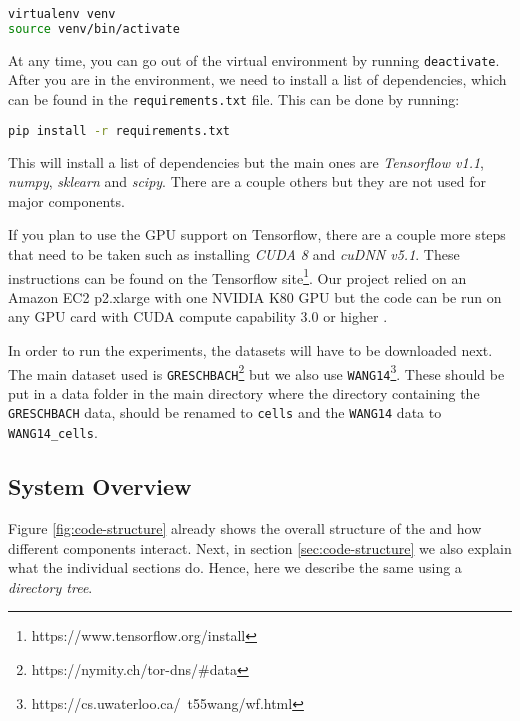 \begin{lstlisting}[language=Bash]
virtualenv venv
source venv/bin/activate
\end{lstlisting}

At any time, you can go out of the virtual environment by running \texttt{deactivate}.
After you are in the environment, we need to install a list of dependencies, which can be found in the \texttt{requirements.txt} file.
This can be done by running:
\begin{lstlisting}[language=Bash]
pip install -r requirements.txt
\end{lstlisting}

This will install a list of dependencies but the main ones are \textit{Tensorflow v1.1}, \textit{numpy}, \textit{sklearn} and \textit{scipy}.
There are a couple others but they are not used for major components.

If you plan to use the GPU support on Tensorflow, there are a couple more steps that need to be taken such as installing \textit{CUDA 8} and \textit{cuDNN v5.1}.
These instructions can be found on the Tensorflow site\footnote{https://www.tensorflow.org/install}.
Our project relied on an Amazon EC2 p2.xlarge with one NVIDIA K80 GPU but the code can be run on any GPU card with CUDA compute capability 3.0 or higher \cite{tensorflow}.

\newpage

In order to run the experiments, the datasets will have to be downloaded next.
The main dataset used is \texttt{GRESCHBACH}\footnote{https://nymity.ch/tor-dns/\#data} but we also use \texttt{WANG14}\footnote{https://cs.uwaterloo.ca/~t55wang/wf.html}.
These should be put in a data folder in the main directory where the directory containing the \texttt{GRESCHBACH} data, should be renamed to \texttt{cells} and the \texttt{WANG14} data to \texttt{WANG14\_cells}.

\subsection{System Overview}

Figure \ref{fig:code-structure} already shows the overall structure of the and how different components interact.
Next, in section \ref{sec:code-structure} we also explain what the individual sections do.
Hence, here we describe the same using a \textit{directory tree}.

